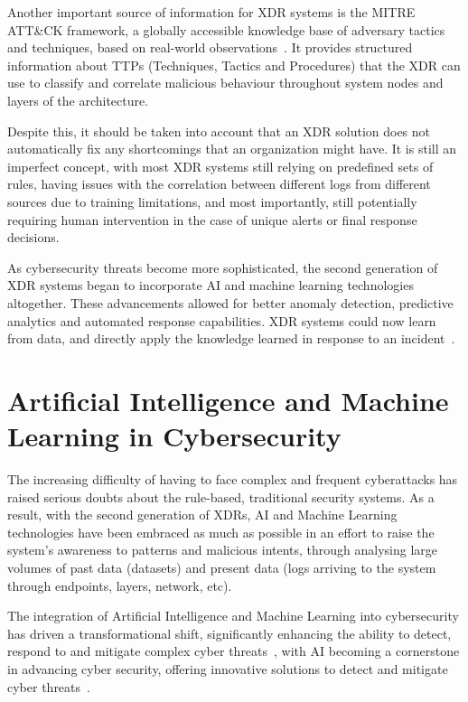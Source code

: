 \documentclass[12pt,a4paper]{report}
\begin{document}
Another important source of information for XDR systems is the MITRE ATT\&CK framework, a
globally accessible knowledge base of adversary tactics and techniques, based on real-world
observations~\cite{ref7}. It provides structured information about TTPs (Techniques, Tactics and
Procedures) that the XDR can use to classify and correlate malicious behaviour throughout system
nodes and layers of the architecture.

Despite this, it should be taken into account that an XDR solution does not automatically fix any
shortcomings that an organization might have. It is still an imperfect concept, with most XDR
systems still relying on predefined sets of rules, having issues with the correlation between
different logs from different sources due to training limitations, and most importantly, still
potentially requiring human intervention in the case of unique alerts or final response decisions.

As cybersecurity threats become more sophisticated, the second generation of XDR systems began
to incorporate AI and machine learning technologies altogether. These advancements allowed for
better anomaly detection, predictive analytics and automated response capabilities. XDR systems
could now learn from data, and directly apply the knowledge learned in response to an
incident~\cite{ref6}.

\section{Artificial Intelligence and Machine Learning in Cybersecurity}

The increasing difficulty of having to face complex and frequent cyberattacks has raised serious
doubts about the rule-based, traditional security systems. As a result, with the second
generation of XDRs, AI and Machine Learning technologies have been embraced as much as possible
in an effort to raise the system's awareness to patterns and malicious intents, through analysing
large volumes of past data (datasets) and present data (logs arriving to the system through
endpoints, layers, network, etc).

The integration of Artificial Intelligence and Machine Learning into cybersecurity has driven a
transformational shift, significantly enhancing the ability to detect, respond to and mitigate
complex cyber threats~\cite{ref8}, with AI becoming a cornerstone in advancing cyber security,
offering innovative solutions to detect and mitigate cyber threats~\cite{ref9}.
\end{document}
